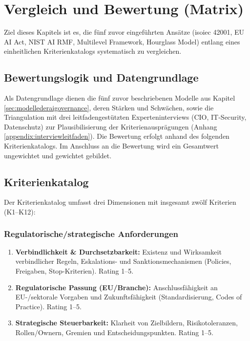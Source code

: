 \section{Vergleich und Bewertung (Matrix)}
\label{sec:vergleichbewertung}
Ziel dieses Kapitels ist es, die fünf zuvor eingeführten Ansätze (\ac{iso}\ac{iec} 42001, EU AI Act, NIST AI RMF, Multilevel Framework, Hourglass Model) entlang eines einheitlichen Kriterienkatalogs systematisch zu vergleichen.

\subsection{Bewertungslogik und Datengrundlage}
\label{subsec:bewertungslogik}
Als Datengrundlage dienen die fünf zuvor beschriebenen Modelle aus Kapitel \ref{sec:modellederaigovernance}, deren Stärken und Schwächen, sowie die Triangulation mit drei leitfadengestützten Experteninterviews (CIO, IT-Security, Datenschutz) zur Plausibilisierung der Kriterienausprägungen (Anhang \ref{appendix:interviewleitfaden}).
Die Bewertung erfolgt anhand des folgenden Kriterienkatalogs.
Im Anschluss an die Bewertung wird ein Gesamtwert ungewichtet und gewichtet gebildet.

\subsection{Kriterienkatalog}
\label{subsec:kriterienkatalog}
Der Kriterienkatalog umfasst drei Dimensionen mit insgesamt zwölf Kriterien (K1–K12):

\subsubsection{Regulatorische/strategische Anforderungen}
\begin{enumerate}
  \item[K1] \textbf{Verbindlichkeit \& Durchsetzbarkeit:} Existenz und Wirksamkeit verbindlicher Regeln, Eskalations- und Sanktionsmechanismen (Policies, Freigaben, Stop-Kriterien). Rating 1–5.
  \item[K2] \textbf{Regulatorische Passung (EU/Branche):} Anschlussfähigkeit an EU-/sektorale Vorgaben und Zukunftsfähigkeit (Standardisierung, Codes of Practice). Rating 1–5.
  \item[K3] \textbf{Strategische Steuerbarkeit:} Klarheit von Zielbildern, Risikotoleranzen, Rollen/Ownern, Gremien und Entscheidungspunkten. Rating 1–5.
\end{enumerate}

